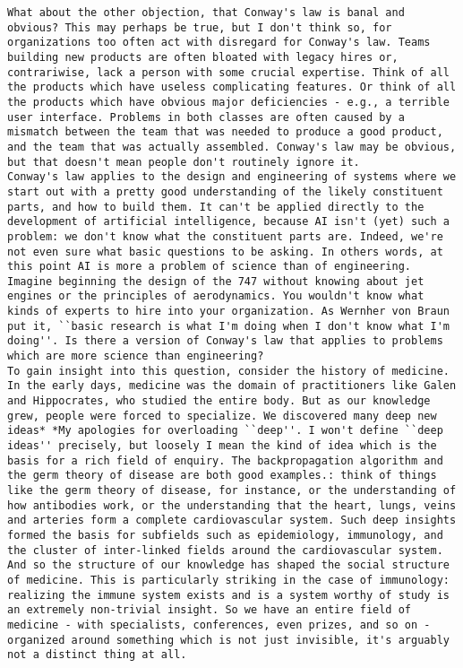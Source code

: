 \begin{lstlisting}
What about the other objection, that Conway's law is banal and obvious? This may perhaps be true, but I don't think so, for organizations too often act with disregard for Conway's law. Teams building new products are often bloated with legacy hires or, contrariwise, lack a person with some crucial expertise. Think of all the products which have useless complicating features. Or think of all the products which have obvious major deficiencies - e.g., a terrible user interface. Problems in both classes are often caused by a mismatch between the team that was needed to produce a good product, and the team that was actually assembled. Conway's law may be obvious, but that doesn't mean people don't routinely ignore it.
Conway's law applies to the design and engineering of systems where we start out with a pretty good understanding of the likely constituent parts, and how to build them. It can't be applied directly to the development of artificial intelligence, because AI isn't (yet) such a problem: we don't know what the constituent parts are. Indeed, we're not even sure what basic questions to be asking. In others words, at this point AI is more a problem of science than of engineering. Imagine beginning the design of the 747 without knowing about jet engines or the principles of aerodynamics. You wouldn't know what kinds of experts to hire into your organization. As Wernher von Braun put it, ``basic research is what I'm doing when I don't know what I'm doing''. Is there a version of Conway's law that applies to problems which are more science than engineering?
To gain insight into this question, consider the history of medicine. In the early days, medicine was the domain of practitioners like Galen and Hippocrates, who studied the entire body. But as our knowledge grew, people were forced to specialize. We discovered many deep new ideas* *My apologies for overloading ``deep''. I won't define ``deep ideas'' precisely, but loosely I mean the kind of idea which is the basis for a rich field of enquiry. The backpropagation algorithm and the germ theory of disease are both good examples.: think of things like the germ theory of disease, for instance, or the understanding of how antibodies work, or the understanding that the heart, lungs, veins and arteries form a complete cardiovascular system. Such deep insights formed the basis for subfields such as epidemiology, immunology, and the cluster of inter-linked fields around the cardiovascular system. And so the structure of our knowledge has shaped the social structure of medicine. This is particularly striking in the case of immunology: realizing the immune system exists and is a system worthy of study is an extremely non-trivial insight. So we have an entire field of medicine - with specialists, conferences, even prizes, and so on - organized around something which is not just invisible, it's arguably not a distinct thing at all.

\end{lstlisting}

